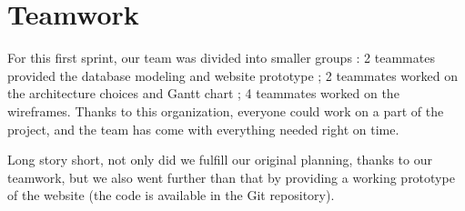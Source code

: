 \section{Teamwork}

For this first sprint, our team was divided into smaller groups : 2
teammates provided the database modeling and website prototype ; 2 teammates
worked on the architecture choices and Gantt chart ; 4 teammates worked on
the wireframes. Thanks to this organization, everyone could work on a part of
the project, and the team has come with everything needed right on time.\newline

Long story short, not only did we fulfill our original planning, thanks to our
teamwork, but we also went further than that by providing a working prototype
of the website (the code is available in the Git repository).
